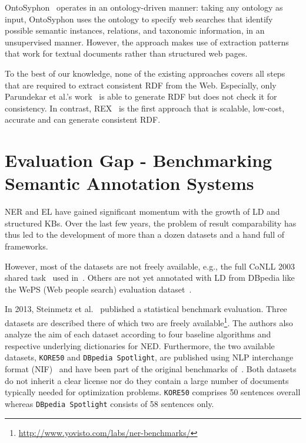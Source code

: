 OntoSyphon~\cite{DBLP:journals/ws/McDowellC08} operates in an ontology-driven manner: taking any ontology as input, OntoSyphon uses the ontology to specify web searches that identify possible semantic instances, relations, and taxonomic information, in an unsupervised manner. However, the approach makes use of extraction patterns that work for textual documents rather than structured web pages.

To the best of our knowledge, none of the existing approaches covers all steps that are required to extract consistent \ac{RDF} from the Web. 
Especially, only Parundekar et al.'s work~\cite{conf/aaaiss/ParundekarKA10} is able to generate \ac{RDF} but does not check it for consistency.
In contrast, REX~\cite{rex} is the first approach that is scalable, low-cost, accurate and can generate consistent \ac{RDF}. 




\section{Evaluation Gap - Benchmarking Semantic Annotation Systems}

\ac{NER} and \ac{EL} have gained significant momentum with the growth of \ac{LD} and structured \ac{KB}s. 
Over the last few years, the problem of result comparability has thus led to the development of more than a dozen datasets and a hand full of frameworks.
\bigskip

However, most of the datasets are not freely available, e.g., the full CoNLL 2003 shared task~\cite{conll2003} used in~\cite{AIDA}.
Others are not yet annotated with \ac{LD} from DBpedia like the WePS (Web people search) evaluation dataset~\cite{WEPS}.

In 2013, Steinmetz et al.~\cite{NEDstatBench} published a statistical benchmark evaluation.
Three datasets are described there of which two are freely available\footnote{\url{http://www.yovisto.com/labs/ner-benchmarks/}}.
The authors also analyze the aim of each dataset according to four baseline algorithms and respective underlying dictionaries for NED.
Furthermore, the two available datasets, \texttt{KORE50} and \texttt{DBpedia Spotlight}, are published using NLP interchange format (NIF)~\cite{ISWC2013NIF} and have been part of the original benchmarks of~\cite{AIDA,spotlight}. 
Both datasets do not inherit a clear license nor do they contain a large number of documents typically needed for optimization problems.
\texttt{KORE50} comprises 50 sentences overall whereas \texttt{DBpedia Spotlight} consists of 58 sentences only. 

